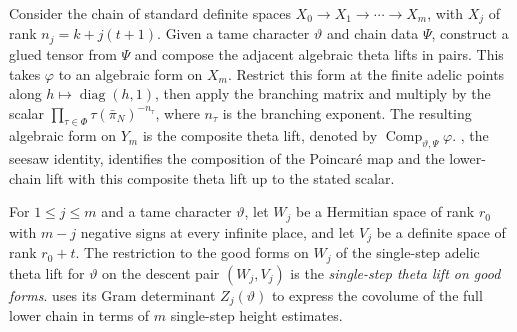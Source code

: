 \begin{definition}
\label{def:composite-theta-lift}
\emitthmsource
Consider the chain of standard definite spaces $X_0\to X_1\to\cdots\to X_m$, with $X_j$ of rank $n_j=k+j(t+1)$. Given a tame character $\vartheta$ and chain data $\Psi$, construct a glued tensor from $\Psi$ and compose the adjacent algebraic theta lifts in pairs. This takes $\varphi$ to an algebraic form on $X_m$. Restrict this form at the finite adelic points along $h\mapsto\operatorname{diag}(h,1)$, then apply the branching matrix and multiply by the scalar $\prod_{\tau\in\Phi}\tau(\bar\pi_N)^{-n_\tau}$, where $n_\tau$ is the branching exponent. The resulting algebraic form on $Y_m$ is the composite theta lift, denoted by $\operatorname{Comp}_{\vartheta,\Psi}\varphi$.
, the seesaw identity, identifies the composition of the Poincaré map and the lower-chain lift with this composite theta lift up to the stated scalar.
\end{definition}

\begin{definition}
\label{def:good-theta-lift}
\emitthmsource
For $1\le j\le m$ and a tame character $\vartheta$, let $W_j$ be a Hermitian space of rank $r_0$ with $m-j$ negative signs at every infinite place, and let $V_j$ be a definite space of rank $r_0+t$.
The restriction to the good forms on $W_j$ of the single-step adelic theta lift for $\vartheta$ on the descent pair $(W_j,V_j)$ is the \emph{single-step theta lift on good forms}.
 uses its Gram determinant $Z_j(\vartheta)$ to express the covolume of the full lower chain in terms of $m$ single-step height estimates.
\end{definition}

